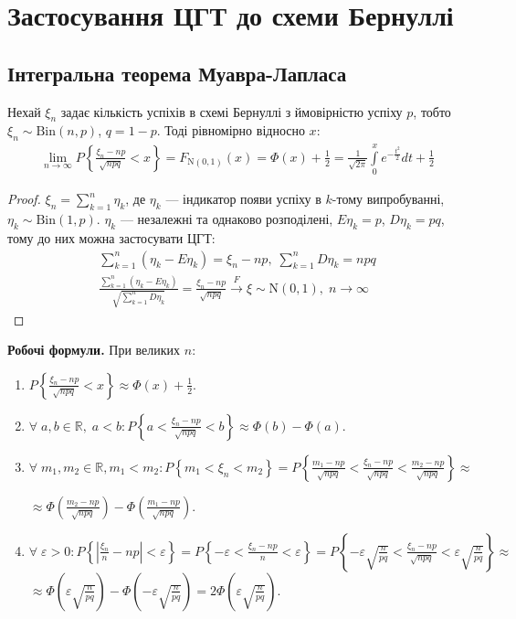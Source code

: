 \section{Застосування ЦГТ до схеми Бернуллі}
\subsection{Інтегральна теорема Муавра-Лапласа}
\begin{theorem*}
    Нехай $\xi_n$ задає кількість успіхів в схемі Бернуллі з ймовірністю успіху $p$, тобто $\xi_n \sim \mathrm{Bin}(n, p)$,
    $q = 1-p$.
    Тоді рівномірно відносно $x$:
    \begin{gather}
        \lim_{n \rightarrow \infty} P \left\{
            \frac{\xi_n - np}{\sqrt{npq}}
            < x
        \right\} = F_{\mathrm{N}(0, 1)}(x) = \Phi(x) + \frac{1}{2} = 
        \frac{1}{\sqrt{2\pi}} \int\limits_0^x e^{-\frac{t^2}{2}} dt + \frac{1}{2}
    \end{gather}
\end{theorem*}
\begin{proof}
    $\xi_n = \sum\limits_{k=1}^n \eta_k$, де $\eta_k$ --- індикатор появи успіху в $k$-тому випробуванні,
    $\eta_k \sim \mathrm{Bin}(1, p)$. $\eta_k$ --- незалежні та однаково розподілені, $E\eta_k = p$, $D\eta_k = pq$,
    тому до них можна застосувати ЦГТ:
    \begin{gather*}
        \sum\limits_{k=1}^n \left( \eta_k - E\eta_k\right) = \xi_n - np, \; \sum\limits_{k=1}^n D\eta_k = n p q \\
        \frac{\sum\limits_{k=1}^n \left( \eta_k - E\eta_k\right)}{\sqrt{\sum\limits_{k=1}^n D\eta_k}} =
         \frac{\xi_n - np}{\sqrt{n p q}} \overset{F}{\longrightarrow} \xi \sim \mathrm{N}(0, 1), \; n\to \infty
    \end{gather*}
\end{proof}
\noindent\textbf{Робочі формули.} При великих $n$:
\begin{enumerate}
    \item $P\left\{ \frac{\xi_n - np}{\sqrt{n p q}} < x\right\} \approx \Phi(x) + \frac{1}{2}$.
    \item $\forall \; a, b \in \mathbb{R}, \; a<b : P\left\{a < \frac{\xi_n - np}{\sqrt{n p q}} < b\right\} \approx \Phi(b) - \Phi(a)$.
    \item $\forall \; m_1, m_2 \in \mathbb{R}, m_1<m_2 : P\left\{ m_1 < \xi_n < m_2\right\} = 
    P\left\{\frac{m_1 - np}{\sqrt{n p q}} < \frac{\xi_n - np}{\sqrt{n p q}} < \frac{m_2 - np}{\sqrt{n p q}}\right\} \approx$

    $\approx \Phi\left(\frac{m_2 - np}{\sqrt{n p q}}\right) - \Phi\left(\frac{m_1 - np}{\sqrt{n p q}}\right)$.
    \item $\forall \; \varepsilon > 0 : P\left\{ \left|\frac{\xi_n}{n} - np\right| < \varepsilon\right\} = 
    P\left\{-\varepsilon < \frac{\xi_n - np}{n} < \varepsilon\right\} =
    P\left\{-\varepsilon \sqrt{\frac{n}{pq}} < \frac{\xi_n - np}{\sqrt{n p q}} < \varepsilon \sqrt{\frac{n}{pq}}\right\} \approx$
    $\approx \Phi\left( \varepsilon \sqrt{\frac{n}{pq}}\right) - \Phi\left( -\varepsilon \sqrt{\frac{n}{pq}}\right) = 2\Phi\left( \varepsilon \sqrt{\frac{n}{pq}}\right)$.
\end{enumerate}
